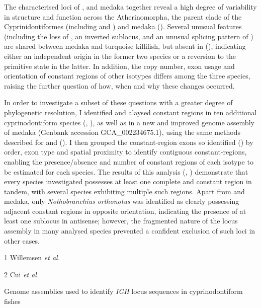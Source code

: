 The characterised \igh{} loci of \nfu, \xma and medaka together reveal a high degree of variability in structure and function across the Atherinomorpha, the parent clade of the Cyprinidontiformes (including \Nfu and \Xma) and medaka (). Several unusual features (including the loss of , an inverted sublocus, and an unusual splicing pattern of ) are shared between medaka and turquoise killifish, but absent in \Xma (), indicating either an independent origin in the former two species or a reversion to the primitive state in the latter. In addition, the copy number, exon usage and orientation of constant regions of other isotypes differs among the three species, raising the further question of how, when and why these changes occurred. 

In order to investigate a subset of these questions with a greater degree of phylogenetic resolution, I identified and alaysed \igh{} constant regions in ten additional cyprinodontiform species (, ), as well as in a new and improved genome assembly of medaka (Genbank accession GCA\_002234675.1), using the same methods described for \Nfu and \Xma (). I then grouped the constant-region exons so identified () by order, exon type and spatial proximity to identify contiguous constant-regions, enabling the presence/absence and number of constant regions of each isotype to be estimated for each species. The results of this analysis (, ) demonstrate that every species investigated possesses at least one complete  and  constant region in tandem, with several species exhibiting multiple such regions. Apart from \Nfu and medaka, only \textit{Nothobranchius orthonotus} was identified as clearly possessing adjacent constant regions in opposite orientation, indicating the presence of at least one sublocus in antisense; however, the fragmented nature of the \igh{} locus assembly in many analysed species prevented a confident exclusion of such loci in other cases.

\begin{table}[bh!]
\centering
\begin{threeparttable}

\begin{tablenotes}
\item[1] Willemsen \textit{et al.} \parencite{willemsen2019popgen}
\item[2] Cui \textit{et al.} \parencite{cui2019annual}
\end{tablenotes}
\end{threeparttable}
\vspace{0.5em}
\caption{Genome assemblies used to identify \textit{IGH} locus sequences in cyprinodontiform fishes}
\label{tab:cyprinodontiform-genomes}
\end{table}

